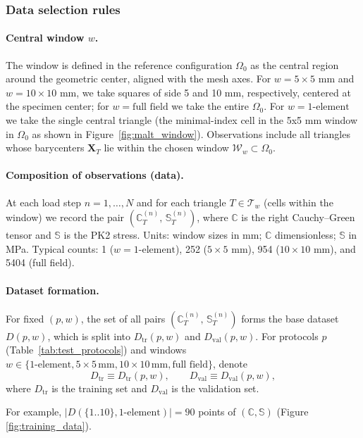 \subsubsection{Data selection rules}
\paragraph{Central window $w$.}
The window is defined in the reference configuration $\Omega_0$ as the central region around the geometric center, aligned with the mesh axes. For $w=5\times5$ mm and $w=10\times10$ mm, we take squares of side 5 and 10 mm, respectively, centered at the specimen center; for $w=\text{full field}$ we take the entire $\Omega_0$. For $w=\text{1-element}$ we take the single central triangle (the minimal-index cell in the 5x5 mm window in $\Omega_0$ as shown in Figure~\ref{fig:malt_window}). Observations include all triangles whose barycenters $\mathbf{X}_T$ lie within the chosen window $\mathcal{W}_w\subset\Omega_0$.

\paragraph{Composition of observations (data).}
At each load step $n=1,\dots,N$ and for each triangle $T\in\mathcal{T}_w$ (cells within the window) we record the pair $(\mathbb C_T^{(n)},\,\mathbb S_T^{(n)})$, where $\mathbb C$ is the right Cauchy--Green tensor and $\mathbb S$ is the PK2 stress. Units: window sizes in mm; $\mathbb C$ dimensionless; $\mathbb S$ in MPa. Typical counts: 1 ($w=\text{1-element}$), 252 ($5\times5$ mm), 954 ($10\times10$ mm), and 5404 (full field).

\paragraph{Dataset formation.}
For fixed $(p,w)$, the set of all pairs $(\mathbb C_T^{(n)},\,\mathbb S_T^{(n)})$ forms the base dataset $D(p,w)$, which is split into $D_{\mathrm{tr}}(p,w)$ and $D_{\mathrm{val}}(p,w)$. For protocols $p$ (Table~\ref{tab:test_protocols}) and windows $w\in\{\text{1-element},5\times5\,\text{mm},10\times10\,\text{mm},\text{full field}\}$, denote
\[
  D_{\mathrm{tr}}\equiv D_{\mathrm{tr}}(p,w),\qquad D_{\mathrm{val}}\equiv D_{\mathrm{val}}(p,w),
\]
where $D_{\mathrm{tr}}$ is the training set and $D_{\mathrm{val}}$ is the validation set.

For example, $|D(\{1..10\}, \text{1-element})|=90$ points of $(\mathbb C,\mathbb S)$ (Figure \ref{fig:training_data}).

